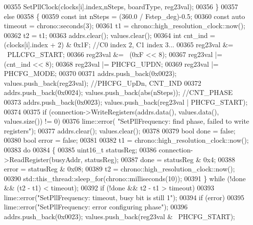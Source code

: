 \begin{DoxyCode}
{{{{{00355            SetPllClock(clocks[i].index,nSteps, boardType, reg23val);
00356         \}
00357         \textcolor{keywordflow}{else}
00358         \{
00359             \textcolor{keyword}{const} \textcolor{keywordtype}{int} nSteps = (360.0 / Fstep\_deg)-0.5;
00360             \textcolor{keyword}{const} \textcolor{keyword}{auto} timeout = chrono::seconds(3);
00361             t1 = chrono::high\_resolution\_clock::now();
00362             t2 = t1;
00363             addrs.clear(); values.clear();
00364             \textcolor{keywordtype}{int} cnt\_ind = (clocks[i].index + 2) & 0x1F; \textcolor{comment}{//C0 index 2, C1 index 3...}
00365             reg23val &= ~PLLCFG\_START;
00366             reg23val &= ~(0xF << 8);
00367             reg23val |= (cnt\_ind << 8);
00368             reg23val |= PHCFG_UPDN;
00369             reg23val |= PHCFG_MODE;
00370 
00371             addrs.push\_back(0x0023); values.push\_back(reg23val); \textcolor{comment}{//PHCFG\_UpDn, CNT\_IND}
00372             addrs.push\_back(0x0024); values.push\_back(abs(nSteps)); \textcolor{comment}{//CNT\_PHASE}
00373             addrs.push\_back(0x0023); values.push\_back(reg23val | PHCFG\_START);
00374 
00375             \textcolor{keywordflow}{if} (connection->WriteRegisters(addrs.data(), values.data(), values.size()) != 0)
00376                 lime::error( \textcolor{stringliteral}{"SetPllFrequency: find phase, failed to write registers"});
00377             addrs.clear(); values.clear();
00378 
00379             \textcolor{keywordtype}{bool} done = \textcolor{keyword}{false};
00380             \textcolor{keywordtype}{bool} error = \textcolor{keyword}{false};
00381 
00382             t1 = chrono::high\_resolution\_clock::now();
00383             \textcolor{keywordflow}{do}
00384             \{
00385                 uint16\_t statusReg;
00386                 connection->ReadRegister(busyAddr, statusReg);
00387                 done = statusReg & 0x4;
00388                 error = statusReg & 0x08;
00389                 t2 = chrono::high\_resolution\_clock::now();
00390                 std::this\_thread::sleep\_for(chrono::milliseconds(10));
00391             \} \textcolor{keywordflow}{while} (!done && (t2 - t1) < timeout);
00392             \textcolor{keywordflow}{if} (!done && t2 - t1 > timeout)
00393                 lime::error(\textcolor{stringliteral}{"SetPllFrequency: timeout, busy bit is still 1"});
00394             \textcolor{keywordflow}{if} (error)
00395                 lime::error(\textcolor{stringliteral}{"SetPllFrequency: error configuring phase"});
00396             addrs.push\_back(0x0023); values.push\_back(reg23val & ~PHCFG\_START);
}}}}}
\end{DoxyCode}
